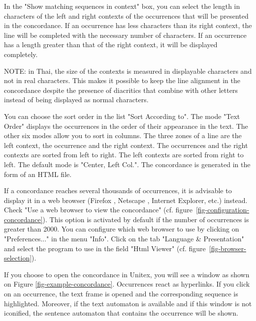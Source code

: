 \bigskip
\noindent In the "Show matching sequences in context" box, you can select the
length in characters of the left and right contexts of the occurrences that will be
presented in the concordance. If an occurrence has less characters than its
right context, the line will be completed with the necessary number of
characters. If an occurrence has a length greater than that of the right
context, it will be displayed completely.

\bigskip
\noindent NOTE: in Thai, the size of the contexts is measured in displayable
characters and not in real characters. This makes it possible to keep the line alignment in
the concordance despite the presence of diacritics that combine with other
letters instead of being displayed as normal characters.

\bigskip
\noindent You can choose the sort order in the list "Sort According to". The
mode "Text Order" displays the occurrences in the order of their appearance in the text. The other six
modes allow you to sort in columns. The three zones of a line are the left
context, the occurrence and the right context. The occurrences and the right
contexts are sorted from left to right. The left contexts are sorted from right
to left. The default mode is "Center, Left Col.". The concordance is generated
in the form of an HTML file.

\bigskip
\noindent If a concordance reaches several thousands of occurrences, it is advisable to
display it  in a web browser (Firefox \cite{Firefox}, Netscape \cite{Netscape},
Internet Explorer, etc.) instead. Check "Use a web
browser to view the concordance" (cf. figure~\ref{fig-configuration-concordance}). 
This option is activated by default if the number of occurrences is greater than 2000.
You can configure which web browser to use by clicking on "Preferences..." in
the menu "Info". Click on the tab "Language \& Presentation" and
select the program to use in the field "Html Viewer" 
(cf. figure~\ref{fig-browser-selection}).

\bigskip
\noindent {} If you choose to open the concordance in
Unitex, you will see a window as shown on Figure \ref{fig-example-concordance}. 
Occurrences react as hyperlinks. If you click on an occurrence, the text frame is
opened and the corresponding sequence is highlighted. Moreover, if the text automaton is
available and if this window is not iconified, the sentence automaton that
contains the occurrence will be shown. 

